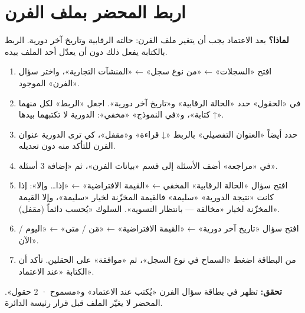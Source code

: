 \section{اربط المحضر بملف الفرن}
\label{sec:real-link}
\textbf{لماذا؟} بعد الاعتماد يجب أن يتغير ملف الفرن: حالته الرقابية وتاريخ آخر دورية. الربط بالكتابة يفعل ذلك دون أن يعدّل أحد الملف بيده.
\begin{enumerate}
\item افتح «السجلات» ← «من نوع سجل» ← «المنشآت التجارية»، واختر سؤال «الفرن» الموجود.
\item في «الحقول» حدد «الحالة الرقابية» و«تاريخ آخر دورية». اجعل «الربط» لكل منهما «↑ كتابة»، و«في النموذج» «مخفي»: الدورية لا تكتبهما بيدها.
\item حدد أيضاً «العنوان التفصيلي» بالربط «↓ قراءة» و«مقفل»، كي ترى الدورية عنوان الفرن للتأكد منه دون تعديله.
\item في «مراجعة» أضف الأسئلة إلى قسم «بيانات الفرن»، ثم «إضافة 3 أسئلة».
\item افتح سؤال «الحالة الرقابية» المخفي ← «القيمة الافتراضية» ← «إذا… وإلا»: إذا كانت «نتيجة الدورية» «سليمة» فالقيمة المخزّنة لخيار «سليمة»، وإلا القيمة المخزّنة لخيار «مخالفة — بانتظار التسوية». السلوك «يُحسب دائماً (مقفل)».
\item افتح سؤال «تاريخ آخر دورية» ← «القيمة الافتراضية» ← «مَن / متى» ← «اليوم / الآن».
\item من البطاقة اضغط «السماح في نوع السجل»، ثم «موافقة» على الحقلين. تأكد أن الكتابة «عند الاعتماد».
\end{enumerate}
\textbf{تحقق:} تظهر في بطاقة سؤال الفرن «يُكتب عند الاعتماد» و«مسموح · 2 حقول». المحضر لا يغيّر الملف قبل قرار رئيسة الدائرة.

